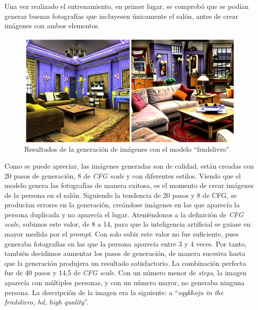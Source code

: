 Una vez realizado el entrenamiento, en primer lugar, se comprobó que se podían generar buenas fotografías que incluyesen únicamente el salón, antes de crear imágenes con ambos elementos.\\

\begin{figure}[!htb]
	\centering
	\includegraphics[width = 1
	\textwidth]{Imagenes/Vectorial/resultadosfrndslivro.png}
	\caption{Resultados de la generación de imágenes con el modelo ``frndslivro''}
	\label{fig:resultsfrnds}
\end{figure}

Como se puede apreciar, las imágenes generadas son de calidad, están creadas con 20 pasos de generación, 8 de \textit{CFG scale} y con diferentes estilos. Viendo que el modelo genera las fotografías de manera exitosa, es el momento de crear imágenes de la persona en el salón. Siguiendo la tendencia de 20 pasos y 8 de CFG, se producían errores en la generación, creándose imágenes en las que aparecía la persona duplicada y no aparecía el lugar. Ateniéndonos a la definición de \textit{CFG scale}, subimos este valor, de 8 a 14, para que la inteligencia artificial se guiase en mayor medida por el \textit{prompt}. Con solo subir este valor no fue suficiente, pues generaba fotografías en las que la persona aparecía entre 3 y 4 veces. Por tanto, también decidimos aumentar los pasos de generación, de manera sucesiva hasta que la generación produjera un resultado satisfactorio. La combinación perfecta fue de 40 pasos y 14,5 de \textit{CFG scale}. Con un número menor de \textit{steps}, la imagen aparecía con múltiples personas, y con un número mayor, no generaba ninguna persona. La descripción de la imagen era la siguiente: a ``\textit{sqgkhoju in the frndslivro, hd, high quality}''.\\

